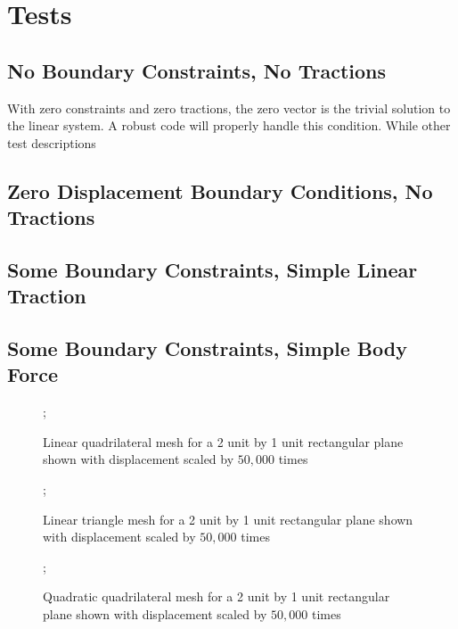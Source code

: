\documentclass{article}
\begin{document}
\section{Tests}

\subsection{No Boundary Constraints, No Tractions}

With zero constraints and zero tractions, the zero vector is the trivial solution to the linear system. A robust code will properly handle this condition. While other test descriptions 


\subsection{Zero Displacement Boundary Conditions, No Tractions}



\subsection{Some Boundary Constraints, Simple Linear Traction}

\subsection{Some Boundary Constraints, Simple Body Force}
\FloatBarrier

\begin{figure}
    ;
    \caption{Linear quadrilateral mesh for a 2 unit by 1 unit rectangular plane shown with displacement scaled by $50,000$ times}
\centering
\end{figure}

\begin{figure}
    ;
    \caption{Linear triangle mesh for a 2 unit by 1 unit rectangular plane shown with displacement scaled by $50,000$ times}
\centering
\end{figure}

\begin{figure}
    ;
    \caption{Quadratic quadrilateral mesh for a 2 unit by 1 unit rectangular plane shown with displacement scaled by $50,000$ times}
\centering
\end{figure}
\end{document}
